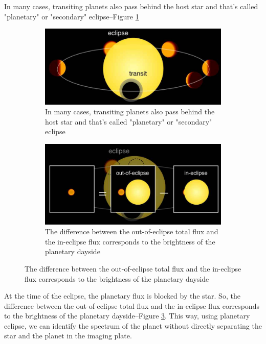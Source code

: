 \documentclass[]{article}
\begin{document}
In many cases, transiting planets also pass behind the host star
and that's called "planetary" or "secondary" eclipse--Figure \ref{fig:secondary-eclipse}
\begin{figure}[H]
	\caption{Secondary Eclipse}
	\begin{subfigure}[b]{0.45\textwidth}
		\caption{In many cases, transiting planets also pass behind the host star
			and that's called "planetary" or "secondary" eclipse}\label{fig:secondary-eclipse}
		\includegraphics[width=\textwidth]{secondary-eclipse}
	\end{subfigure}
	\begin{subfigure}[b]{0.45\textwidth}
		\caption{The difference between
			the out-of-eclipse total flux
			and the in-eclipse flux
			corresponds to the brightness
			of the planetary dayside}\label{fig:secondary-eclipse1}
		\includegraphics[width=\textwidth]{secondary-eclipse1}
	\end{subfigure}
\end{figure}
At the time of the eclipse,
the planetary flux is blocked by the star.
So, the difference between
the out-of-eclipse total flux
and the in-eclipse flux
corresponds to the brightness
of the planetary dayside--Figure \ref{fig:secondary-eclipse1}.
This way, using planetary eclipse,
we can identify the spectrum
of the planet
without directly separating the star
and the planet in the imaging plate.
\end{document}
